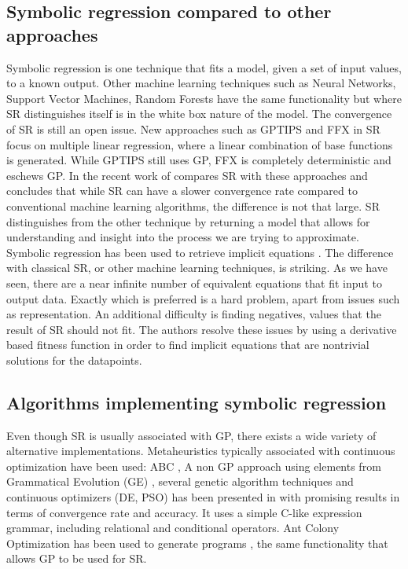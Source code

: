 \subsection{Symbolic regression compared to other approaches}
Symbolic regression is one technique that fits a model, given a set of input values, to a known output. Other machine learning techniques such as Neural Networks, Support Vector Machines, Random Forests have the same functionality but where SR distinguishes itself is in the white box nature of the model. The convergence of SR is still an open issue. New approaches such as GPTIPS and FFX \citep{GPTIPS, FFX} in SR focus on multiple linear regression, where a linear combination of base functions is generated. While GPTIPS still uses GP, FFX is completely deterministic and eschews GP.
In the recent work of \citep{SRlinear} compares SR with these approaches and concludes that while SR can have a slower convergence rate compared to conventional machine learning algorithms, the difference is not that large. SR distinguishes from the other technique by returning a model that allows for understanding and insight into the process we are trying to approximate.
Symbolic regression has been used to retrieve implicit equations \citep{SRimplicit}. The difference with classical SR, or other machine learning techniques, is striking. As we have seen, there are a near infinite number of equivalent equations that fit input to output data. Exactly which is preferred is a hard problem, apart from issues such as representation. An additional difficulty is finding negatives, values that the result of SR should not fit. The authors resolve these issues by using a derivative based fitness function in order to find implicit equations that are nontrivial solutions for the datapoints.

\subsection{Algorithms implementing symbolic regression}
Even though SR is usually associated with GP, there exists a wide variety of alternative implementations. Metaheuristics typically associated with continuous optimization have been used: ABC \cite{ABCSR}, 
A non GP approach using elements from Grammatical Evolution (GE) \cite{GE}, several genetic algorithm techniques and continuous optimizers (DE, PSO) has been presented in \citep{AEG} with promising results in terms of convergence rate and accuracy. It uses a simple C-like expression grammar, including relational and conditional operators. Ant Colony Optimization \citep{ACO} has been used to generate programs \citep{ACOSR}, the same functionality that allows GP to be used for SR.

